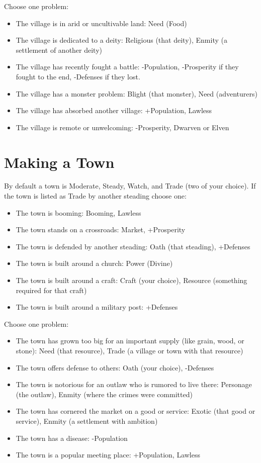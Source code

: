  Choose one problem:
\begin{itemize}
\item The village is in arid or uncultivable land: Need (Food)
\item The village is dedicated to a deity: Religious (that deity), Enmity (a settlement of another deity)
\item The village has recently fought a battle: -Population, -Prosperity if they fought to the end, -Defenses if they lost.
\item The village has a monster problem: Blight (that monster), Need (adventurers)
\item The village has absorbed another village: +Population, Lawless
\item The village is remote or unwelcoming: -Prosperity, Dwarven or Elven

\end{itemize}
\section*{Making a Town}


 By default a town is Moderate, Steady, Watch, and Trade (two of your choice). If the town is listed as Trade by another steading choose one:
\begin{itemize}
\item The town is booming: Booming, Lawless
\item The town stands on a crossroads: Market, +Prosperity
\item The town is defended by another steading: Oath (that steading), +Defenses
\item The town is built around a church: Power (Divine)
\item The town is built around a craft: Craft (your choice), Resource (something required for that craft)
\item The town is built around a military post: +Defenses

\end{itemize}


 Choose one problem:
\begin{itemize}
\item The town has grown too big for an important supply (like grain, wood, or stone): Need (that resource), Trade (a village or town with that resource)
\item The town offers defense to others: Oath (your choice), -Defenses
\item The town is notorious for an outlaw who is rumored to live there: Personage (the outlaw), Enmity (where the crimes were committed)
\item The town has cornered the market on a good or service: Exotic (that good or service), Enmity (a settlement with ambition)
\item The town has a disease: -Population
\item The town is a popular meeting place: +Population, Lawless

\end{itemize}
